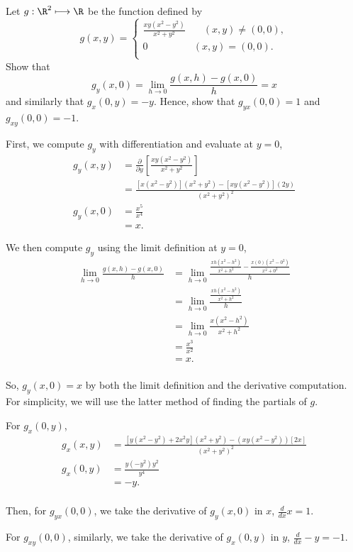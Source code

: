 \documentclass{article}
\begin{document}
  \begin{problem}
    Let $g:\R^{2}\longmapsto\R$ be the function defined by  \[
    g(x,y)=\begin{cases}
      \frac{xy(x^2-y^2)}{x^2+y^2}& \quad (x,y)\neq(0,0),\\
      0& (x,y)=(0,0).\\
    \end{cases}
    \] 
    Show that \[
      g_y(x,0)=\lim\limits_{h\to 0}\frac{g(x,h)-g(x,0)}{h}=x
    \] 
    and similarly that $g_x(0,y)=-y$. Hence, show that $g_{yx}(0,0)=1$ and $g_{xy}(0,0)=-1$.
  \end{problem}

  First, we compute $g_y$ with differentiation and evaluate at $y=0$,
  \begin{align*}
    g_y(x,y) &= \frac{\partial}{\partial y}\left[ \frac{xy(x^2-y^2)}{x^2+y^2} \right] \\ 
             &= \frac{\left[ x(x^2-y^2) \right](x^2+y^2)-\left[ xy(x^2-y^2) \right](2y)}{{(x^2+y^2)}^2} \\
    g_y(x,0) &= \frac{x^5}{x^4} \\
             &= x.
  \end{align*}

  We then compute $g_y$ using the limit definition at $y=0$,
  \begin{align*}
    \lim\limits_{h\to 0}\frac{g(x,h)-g(x,0)}{h} &= \lim\limits_{h\to 0}\frac{\frac{xh(x^2-h^2)}{x^2+h^2}-\frac{x(0)(x^2-0^2)}{x^2+0^2}}{h} \\
                                                &= \lim\limits_{h\to 0}\frac{\frac{xh(x^2-h^2)}{x^2+h^2}}{h} \\
                                                &= \lim\limits_{h\to 0}\frac{x(x^2-h^2)}{x^2+h^2} \\
                                                &= \frac{x^3}{x^2} \\
                                                &= x. \\
  \end{align*}

  So, $g_y(x,0)=x$ by both the limit definition and the derivative computation. For simplicity, we will use the latter method of finding the partials of  $g$. 

  For  $g_x(0,y)$,
  \begin{align*}
    g_x(x,y)&=\frac{[y(x^2-y^2)+2x^2 y](x^2+y^2)-(xy(x^2-y^2))[2x]}{{(x^2+y^2)}^2} \\
    g_x(0,y) &= \frac{y(-y^2)y^2}{y^4} \\
             &= -y. \\
  \end{align*}

  Then, for $g_{yx}(0,0)$, we take the derivative of $g_y(x,0)$ in $x$, $\frac{d}{dx}x=1$. 

  For $g_{xy}(0,0)$, similarly, we take the derivative of $g_x(0,y)$ in  $y$,  $\frac{d}{dx}-y=-1$. 
\end{document}
